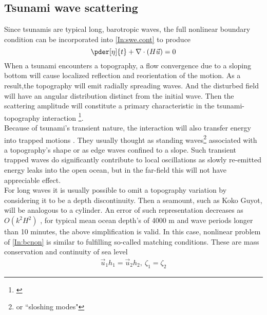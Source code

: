\documentclass[12pt]{article}
\begin{document}
\subsection{Tsunami wave scattering}
Since tsunamis are typical long, barotropic waves, the full nonlinear boundary condition can be 
incorporated into \eqref{In:swe.cont} to produce
\begin{equation}
\pder[\eta]{t} + \nabla  \cdot (H \vec{u}) = 0 
\end{equation}
When a tsunami encounters a topography, a flow convergence due to a sloping bottom will 
cause localized reflection and reorientation of the motion. As a result,the topography will emit 
radially spreading waves. And the disturbed field will have an angular distribution distinct from 
the initial wave. Then the scattering amplitude will constitute a primary characteristic in the 
tsunami-topography interaction \footnote{\citep{vastano1973transient, saito2009scattering}}.\\
Because of tsunami's transient nature, the interaction will also transfer energy into trapped 
motions \citep{longuet1967trapping, tinti1995tsunami}. They usually thought as standing 
waves\footnote{ or ``sloshing modes"} associated with a topography's shape or as edge waves 
confined to a slope. Such transient trapped waves do significantly contribute to local 
oscillations as slowly re-emitted energy leaks into the open ocean, but in the far-field this will 
not have appreciable effect.\\
For long waves it is usually possible to omit a topography variation by considering it to be a 
depth discontinuity. Then a seamount, such as Koko Guyot, will be analogous to a cylinder. An error 
of such representation decreases as $O(k^2 H^2)$ \citep{mei1989theory}, for typical mean ocean 
depth's of 4000 m and wave periods longer than 10 minutes, the above simplification is valid. In 
this case, nonlinear problem of \eqref{In:bcnon} is similar to fulfilling so-called matching 
conditions. These are mass conservation and continuity of sea level
\begin{align}
\vec{u}_1 h_1 = \vec{u}_2 h_2,~\zeta_1 = \zeta_2
\end{align}
\end{document}
